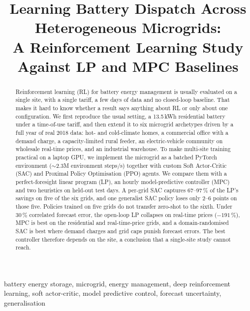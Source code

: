 \documentclass[conference]{IEEEtran}
\begin{document}
\title{Learning Battery Dispatch Across Heterogeneous Microgrids:\\
A Reinforcement Learning Study Against LP and MPC Baselines}

\author{
}

\maketitle

\begin{abstract}
Reinforcement learning (RL) for battery energy management is usually evaluated
on a single site, with a single tariff, a few days of data and no closed-loop
baseline. That makes it hard to know whether a result says anything about RL
or only about one configuration. We first reproduce the usual setting, a 13.5\,kWh
residential battery under a time-of-use tariff, and then extend it to six
microgrid archetypes driven by a full year of real 2018 data: hot- and
cold-climate homes, a commercial office with a demand charge, a capacity-limited
rural feeder, an electric-vehicle community on wholesale real-time prices, and
an industrial warehouse. To make multi-site training practical on a laptop
GPU, we implement the microgrid as a batched PyTorch environment
(${\sim}2.3$M environment steps/s) together with custom Soft Actor-Critic (SAC)
and Proximal Policy Optimisation (PPO) agents. We compare them with a
perfect-foresight linear program (LP), an hourly model-predictive controller
(MPC) and two heuristics on held-out test days. A per-grid SAC captures 67--97\,\% of the
LP's savings on five of the six grids, and one generalist SAC policy loses only
2--6 points on those five. Policies trained on five grids do not transfer
zero-shot to the sixth. Under 30\,\% correlated forecast error, the open-loop LP
collapses on real-time prices ($-191$\,\%), MPC is best on the residential and
real-time-price grids, and a domain-randomised SAC is best where demand
charges and grid caps punish forecast errors. The best controller therefore
depends on the site, a conclusion that a single-site study cannot reach.
\end{abstract}

\begin{IEEEkeywords}
battery energy storage, microgrid, energy management, deep reinforcement
learning, soft actor-critic, model predictive control, forecast uncertainty,
generalisation
\end{IEEEkeywords}
\end{document}
